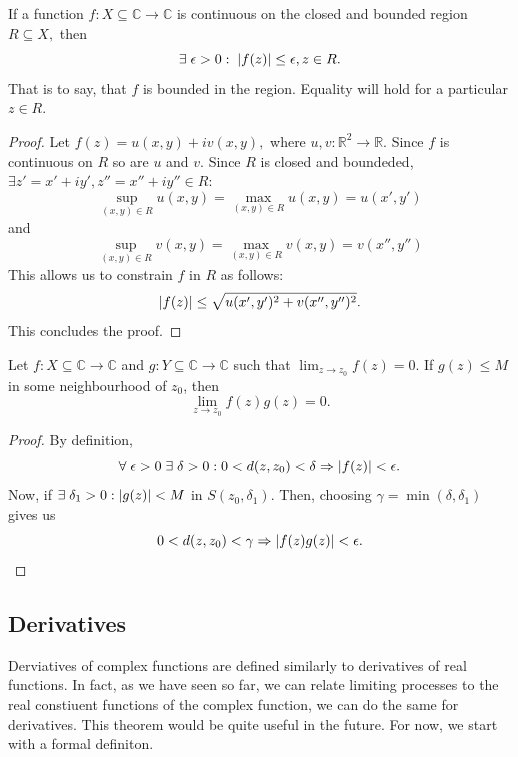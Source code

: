 \documentclass[12pt]{book}
\begin{document}
\begin{thm}[Boundedness]
    If a function $f: X \subseteq \mathbb{C} \rightarrow \mathbb{C}$ is continuous on the closed and bounded region $R \subseteq X,$ then 
    $$
        \exists\; \epsilon > 0: \; \left\lvert f(z) \right\rvert \leq \epsilon, z \in R.
    $$
    That is to say, that $f$ is bounded in the region. Equality will hold for a particular $z \in R.$
\end{thm}
\begin{proof}
    Let $f(z) = u(x, y) + iv(x, y),$ where $u, v: \mathbb{R}^{2} \rightarrow \mathbb{R}.$ Since $f$ is continuous on $R$ so are $u$ and $v.$ Since $R$ is closed and boundeded, $\exists z' = x' + iy', z'' = x'' + iy'' \in R: $
    $$
        \sup_{(x, y) \in R} u(x, y) = \max_{(x, y) \in R} u(x, y) = u(x', y')
    $$
    and
    $$
        \sup_{(x, y) \in R} v(x, y) = \max_{(x, y) \in R} v(x, y) = v(x'', y'')
    $$
    This allows us to constrain $f$ in $R$ as follows:
    $$
        \left\lvert f(z) \right\rvert \leq \sqrt{u(x', y')^2 + v(x'', y'')^2}.
    $$
This concludes the proof.
\end{proof}

\begin{thm}
    Let $f: X \subseteq \mathbb{C} \rightarrow \mathbb{C}$ and $g: Y \subseteq \mathbb{C} \rightarrow \mathbb{C}$ such that $\lim_{z \rightarrow z_0}f(z) = 0.$ If $g(z) \leq M$ in some neighbourhood of $z_0$, then
    $$
        \lim_{z \rightarrow z_0}f(z)g(z) = 0.
    $$
\end{thm}
\begin{proof}
    By definition, 
    $$
        \forall\; \epsilon > 0\; \exists\; \delta > 0: 0 < d(z, z_0) < \delta \Rightarrow \left\lvert f(z) \right\rvert < \epsilon.
    $$
    Now, if $\exists\; \delta_1 > 0: \left\lvert g(z) \right\rvert < M$ in $S(z_0, \delta_1).$ Then, choosing $\gamma = \min(\delta, \delta_1)$ gives us
    $$
        0 < d(z, z_0) < \gamma \Rightarrow \left\lvert f(z)g(z) \right\rvert < \epsilon.
    $$   
\end{proof}

\subsection{Derivatives}
Derviatives of complex functions are defined similarly to derivatives of real functions. In fact, as we have seen so far, we can relate limiting processes to the real constiuent functions of the complex function, we can do the same for derivatives. This theorem would be quite useful in the future. For now, we start with a formal definiton.
\end{document}

